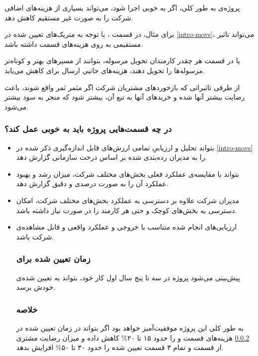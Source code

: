 \documentclass[12pt, dvipsnames, svgnames, x11names,]{article}
\begin{document}
پروژه‌ی  به طور کلی، اگر به خوبی اجرا شود، می‌تواند بسیاری از هزینه‌های اضافی شرکت  را به صورت غیر مستقیم کاهش دهد.

برای مثال، در قسمت ، با توجه به متریک‌های تعیین شده در \ref{intro-movs}، 
می‌تواند تاثیر مستقیمی به روی هزینه‌های قسمت  داشته باشد.

یا در قسمت  هر چقدر کارمندان تحویل مرسوله، بتوانند از مسیر‌های بهتر و کوتاه‌تر مرسوله‌ها را تحویل دهند، هزینه‌های جانبی ارسال برای  کاهش می‌یابد.

از طرفی تاثیراتی که بازخورد‌های مشتریان شرکت اگر مثمر ثمر واقع شوند، باعث رضایت بیشتر آنها شده و خرید‌‌های آنها به تبع آن، بیشتر شود که منجر به سود بیشتر 
می‌شود.
\subsubsection{در چه قسمت‌هایی پروژه باید به خوبی عمل کند؟}
\begin{itemize}
    \item 
    بتواند تحلیل و ارزیابیِ تمامی ارزش‌های قابل‌ اندازه‌گیری ذکر شده در \ref{intro-movs} را به مدیران رده‌بندی‌ شده بر اساس درخت سازمانی گزارش دهد.
    \item 
    بتواند با مقایسه‌ی عملکرد فعلی بخش‌های مختلف شرکت، میزان رشد و بهبود عملکرد آن را به صورت درصدی و دقیق گزارش دهد.
    \item
    مدیران شرکت علاوه‌ بر دسترسی به عملکرد بخش‌های مختلف شرکت، امکان دسترسی به بخش‌های کوچک و حتی هر کارمند را در صورت نیاز داشته باشد.
    
    \item 
    ارزیابی‌های انجام شده متناسب‌ با خروجی و عملکرد واقعی و قابل مشاهده‌ی شرکت باشد.
    
    \subsubsection{زمان تعیین شده برای }\label{time}
    پیش‌بینی می‌شود پروژه در سه تا پنج سال اول کار خود، بتواند به  تعیین شده‌ی خودش برسد.
    \subsubsection{خلاصه‌} 
    به طور کلی این پروژه موفقیت‌آمیز خواهد بود اگر بتواند در زمان تعیین شده در \ref{time}
    هزینه‌های قسمت  و 
    را حدود ۱۵ تا ۲۰\% کاهش داده و میزان رضایت مشتری از قسمت  و تمام ۳ قسمت تعیین شده را حدود ۳۰ تا ۵۰\% افزایش بدهد.
\end{itemize}
\end{document}
